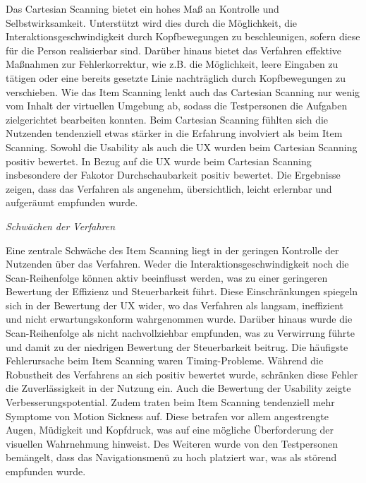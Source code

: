 Das Cartesian Scanning bietet ein hohes Maß an Kontrolle und Selbstwirksamkeit. Unterstützt wird dies durch die Möglichkeit, die Interaktionsgeschwindigkeit durch Kopfbewegungen zu beschleunigen, sofern diese für die Person realisierbar sind. Darüber hinaus bietet das Verfahren effektive Maßnahmen zur Fehlerkorrektur, wie z.B. die Möglichkeit, leere Eingaben zu tätigen oder eine bereits gesetzte Linie nachträglich durch Kopfbewegungen zu verschieben.
Wie das Item Scanning lenkt auch das Cartesian Scanning nur wenig vom Inhalt der virtuellen Umgebung ab, sodass die Testpersonen die Aufgaben zielgerichtet bearbeiten konnten. Beim Cartesian Scanning fühlten sich die Nutzenden tendenziell etwas stärker in die Erfahrung involviert als beim Item Scanning.
Sowohl die Usability als auch die UX wurden beim Cartesian Scanning positiv bewertet. In Bezug auf die UX wurde beim Cartesian Scanning insbesondere der Fakotor Durchschaubarkeit positiv bewertet. Die Ergebnisse zeigen, dass das Verfahren als angenehm, übersichtlich, leicht erlernbar und aufgeräumt empfunden wurde.

\textit{Schwächen der Verfahren}

Eine zentrale Schwäche des Item Scanning liegt in der geringen Kontrolle der Nutzenden über das Verfahren. Weder die Interaktionsgeschwindigkeit noch die Scan-Reihenfolge können aktiv beeinflusst werden, was zu einer geringeren Bewertung der Effizienz und Steuerbarkeit führt. Diese Einschränkungen spiegeln sich in der Bewertung der UX wider, wo das Verfahren als langsam, ineffizient und nicht erwartungskonform wahrgenommen wurde. Darüber hinaus wurde die Scan-Reihenfolge als nicht nachvollziehbar empfunden, was zu Verwirrung führte und damit zu der niedrigen Bewertung der Steuerbarkeit beitrug.
Die häufigste Fehlerursache beim Item Scanning waren Timing-Probleme. Während die Robustheit des Verfahrens an sich positiv bewertet wurde, schränken diese Fehler die Zuverlässigkeit in der Nutzung ein. Auch die Bewertung der Usability zeigte Verbesserungspotential.
Zudem traten beim Item Scanning tendenziell mehr Symptome von Motion Sickness auf. Diese betrafen vor allem angestrengte Augen, Müdigkeit und Kopfdruck, was auf eine mögliche Überforderung der visuellen Wahrnehmung hinweist. Des Weiteren wurde von den Testpersonen bemängelt, dass das Navigationsmenü zu hoch platziert war, was als störend empfunden wurde. 

